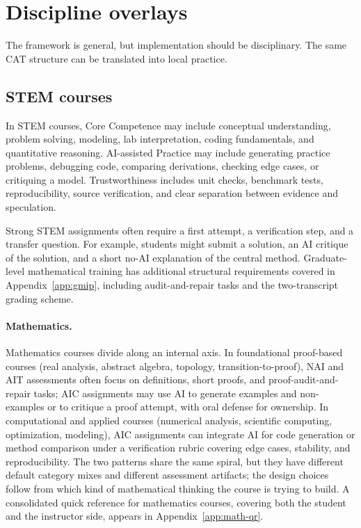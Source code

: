 \documentclass{SIAMbook2023}
\begin{document}
\section{Discipline overlays}
\label{i:sec:discipline-overlays}%

The framework is general, but implementation should be disciplinary. The same CAT structure can be translated into local practice.

\subsection{STEM courses}
\label{i:subsec:stem}%

In STEM courses, Core Competence may include conceptual understanding, problem solving, modeling, lab interpretation, coding fundamentals, and quantitative reasoning. AI-assisted Practice may include generating practice problems, debugging code, comparing derivations, checking edge cases, or critiquing a model. Trustworthiness includes unit checks, benchmark tests, reproducibility, source verification, and clear separation between evidence and speculation.

Strong STEM assignments often require a first attempt, a verification step, and a transfer question. For example, students might submit a solution, an AI critique of the solution, and a short no-AI explanation of the central method. Graduate-level mathematical training has additional structural requirements covered in Appendix~\ref{app:gmip}, including audit-and-repair tasks and the two-transcript grading scheme.

\paragraph{Mathematics.} Mathematics courses divide along an internal axis. In foundational proof-based courses (real analysis, abstract algebra, topology, transition-to-proof), NAI and AIT assessments often focus on definitions, short proofs, and proof-audit-and-repair tasks; AIC assignments may use AI to generate examples and non-examples or to critique a proof attempt, with oral defense for ownership. In computational and applied courses (numerical analysis, scientific computing, optimization, modeling), AIC assignments can integrate AI for code generation or method comparison under a verification rubric covering edge cases, stability, and reproducibility. The two patterns share the same spiral, but they have different default category mixes and different assessment artifacts; the design choices follow from which kind of mathematical thinking the course is trying to build. A consolidated quick reference for mathematics courses, covering both the student and the instructor side, appears in Appendix~\ref{app:math-qr}.
\end{document}
